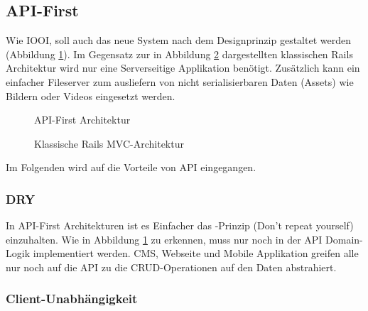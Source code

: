 \subsection{API-First}
\label{ssec:ea-api-first}

Wie IOOI, soll auch das neue System nach dem  \cite{api-first}
Designprinzip gestaltet werden (Abbildung \ref{fig:api-first-architektur}).  Im
Gegensatz zur in Abbildung \ref{fig:klassische-rails-architektur} dargestellten
klassischen Rails Architektur wird nur eine Serverseitige Applikation benötigt.
Zusätzlich kann ein einfacher Fileserver zum ausliefern von nicht
serialisierbaren Daten (Assets) wie Bildern oder Videos eingesetzt werden.

\begin{figure}[h]
	\centering
	
	\caption{API-First Architektur}
	\label{fig:api-first-architektur}
\end{figure}

\begin{figure}[h]
	\centering
	
	\caption{Klassische Rails MVC-Architektur}
	\label{fig:klassische-rails-architektur}
\end{figure}

Im Folgenden wird auf die Vorteile von API eingegangen. 

\subsubsection{DRY}
\label{sssec:eaa-dry}

In API-First Architekturen ist es Einfacher das -Prinzip (Don't
repeat yourself) einzuhalten. Wie in Abbildung \ref{fig:api-first-architektur}
zu erkennen, muss nur noch in der API Domain-Logik implementiert werden.  CMS,
Webseite und Mobile Applikation greifen alle nur noch auf die API zu die
CRUD-Operationen auf den Daten abstrahiert.

\subsubsection{Client-Unabhängigkeit}
\label{sssec:eaa-client-unabhaengigkeit}


